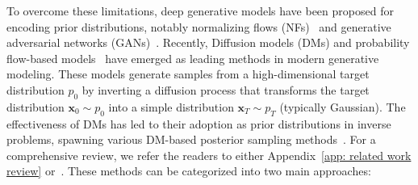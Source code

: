 \documentclass{article}
\numberwithin{equation}{section}
\def\vx{{\bm{x}}}
\begin{document}
To overcome these limitations, deep generative models have been proposed for encoding prior distributions, notably normalizing flows (NFs)~\cite{asim2020invertible,hou2019solving,zhang2021multiscale,whang2021composing,whang2021solving,hagemann2022stochastic} and generative adversarial networks (GANs)~\cite{patel2019bayesian,bora2017compressed}.
Recently, Diffusion models (DMs) and probability flow-based models~\cite{albergo2023stochastic, albergo2022building,lipman2022flow, liu2022flow, sohl2015deep, ho2020denoising,song2020denoising,song2021maximum, song2019generative, song2020score, zhang2018monge} have emerged as leading methods in modern generative modeling. These models generate samples from a high-dimensional target distribution $p_0$ by inverting a diffusion process that transforms the target distribution $\vx_0 \sim p_0$ into a simple distribution $\vx_T \sim p_T$ (typically Gaussian). The effectiveness of DMs has led to their adoption as prior distributions in inverse problems, spawning various DM-based posterior sampling methods~\cite{chung2022diffusion,song2023pseudoinverse,wu2023practical,cardoso2023monte,dou2024diffusion,sun2024provable,xu2024provably,wu2024principled,bruna2024provable}. For a comprehensive review, we refer the readers to either Appendix~\ref{app: related work review}  or~\cite{daras2024survey}. These methods can be categorized into two main approaches:
\end{document}
